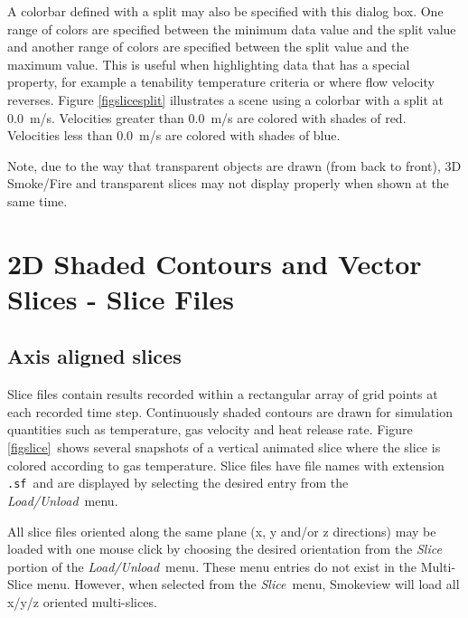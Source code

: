 \documentclass[11pt,twoside]{book}
\begin{document}
A colorbar defined with a split may also be specified with this dialog box.  One range of colors are specified between the minimum
data value and the split value and another range of colors are specified between the split value and the maximum value. This is useful when highlighting
data that has a special property, for example a tenability temperature criteria or where flow velocity reverses.
Figure \ref{figslicesplit} illustrates a scene using a colorbar with a split at 0.0~m/s. Velocities greater than 0.0~m/s are colored with shades of red.
Velocities less than 0.0~m/s are colored with shades of blue.

Note, due to the way that transparent objects are drawn (from back to front),
3D Smoke/Fire and transparent slices may not display
properly when shown at the same time.

\section{2D Shaded Contours and Vector Slices - Slice Files}
\label{section:slices}
\subsection{Axis aligned slices}

Slice files contain results recorded within a rectangular array of
grid points at each recorded time step. Continuously shaded
contours are drawn for simulation quantities such as temperature,
gas velocity and heat release rate. Figure \ref{figslice}\ shows
several snapshots of a vertical animated slice where the slice is
colored according to gas temperature. Slice files have file names
with extension {\tt .sf}\ and are displayed by selecting the
desired entry from the {\em Load/Unload}\ menu.

All slice files oriented along the same plane (x, y and/or z directions) may be loaded
with one mouse click by choosing the desired orientation from the {\em Slice}
portion of the {\em Load/Unload}\ menu.  These menu entries do not exist in the Multi-Slice menu.
However, when selected from the {\em Slice}\ menu, Smokeview will load all x/y/z oriented multi-slices.
\end{document}

